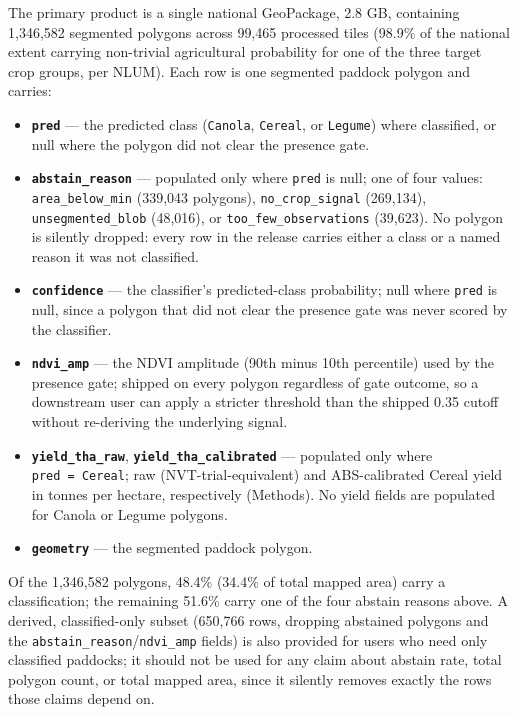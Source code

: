 The primary product is a single national GeoPackage, 2.8 GB, containing 1,346,582 segmented polygons across 99,465 processed tiles (98.9\% of the national extent carrying non-trivial agricultural probability for one of the three target crop groups, per NLUM). Each row is one segmented paddock polygon and carries:

\begin{itemize}
\tightlist
\item
  \textbf{\texttt{pred}} --- the predicted class (\texttt{Canola}, \texttt{Cereal}, or \texttt{Legume}) where classified, or null where the polygon did not clear the presence gate.
\item
  \textbf{\texttt{abstain\_reason}} --- populated only where \texttt{pred} is null; one of four values: \texttt{area\_below\_min} (339,043 polygons), \texttt{no\_crop\_signal} (269,134), \texttt{unsegmented\_blob} (48,016), or \texttt{too\_few\_observations} (39,623). No polygon is silently dropped: every row in the release carries either a class or a named reason it was not classified.
\item
  \textbf{\texttt{confidence}} --- the classifier's predicted-class probability; null where \texttt{pred} is null, since a polygon that did not clear the presence gate was never scored by the classifier.
\item
  \textbf{\texttt{ndvi\_amp}} --- the NDVI amplitude (90th minus 10th percentile) used by the presence gate; shipped on every polygon regardless of gate outcome, so a downstream user can apply a stricter threshold than the shipped 0.35 cutoff without re-deriving the underlying signal.
\item
  \textbf{\texttt{yield\_tha\_raw}}, \textbf{\texttt{yield\_tha\_calibrated}} --- populated only where \texttt{pred\ =\ Cereal}; raw (NVT-trial-equivalent) and ABS-calibrated Cereal yield in tonnes per hectare, respectively (Methods). No yield fields are populated for Canola or Legume polygons.
\item
  \textbf{\texttt{geometry}} --- the segmented paddock polygon.
\end{itemize}

Of the 1,346,582 polygons, 48.4\% (34.4\% of total mapped area) carry a classification; the remaining 51.6\% carry one of the four abstain reasons above. A derived, classified-only subset (650,766 rows, dropping abstained polygons and the \texttt{abstain\_reason}/\texttt{ndvi\_amp} fields) is also provided for users who need only classified paddocks; it should not be used for any claim about abstain rate, total polygon count, or total mapped area, since it silently removes exactly the rows those claims depend on.

